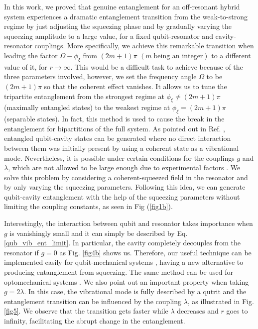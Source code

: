 In this work, we proved that genuine entanglement for an off-resonant hybrid system experiences a dramatic entanglement transition from the weak-to-strong regime by just adjusting the squeezing phase and by gradually varying the squeezing amplitude to a large value, for a fixed qubit-resonator and cavity-resonator couplings. More specifically, we achieve this remarkable transition when leading the factor $\Omega-\phi_{\xi}$ from $(2m+1)\pi$ $(m\; \text{being an integer})$ to a different value of it, for $r\rightarrow \infty$. This would be a difficult task to achieve because of the three parameters involved, however, we set the frequency angle $\Omega$ to be $(2m+1)\pi$ so that the coherent effect vanishes. It allows us to tune the tripartite entanglement from the strongest regime at $\phi_{\xi}\neq (2m+1)\pi$ (maximally entangled states) to the weakest regime at $\phi_{\xi}=(2m+1)\pi$ (separable states). In fact, this method is used to cause the break in the entanglement for bipartitions of the full system. As pointed out in Ref. \citep{montenegro2019mechanical}, entangled qubit-cavity states can be generated where no direct interaction between them was initially present by using a coherent state as a vibrational mode. Nevertheless, it is possible under certain conditions for the couplings $g$ and $\lambda$, which are not allowed to be large enough due to experimental factors \cite{xuereb2012strong, vanner2011pulsed}. We solve this problem by considering a coherent-squeezed field in the resonator and by only varying the squeezing parameters. Following this idea, we can generate qubit-cavity entanglement with the help of the squeezing parameters without limiting the coupling constants, as seen in Fig (\ref{fig1b}). 

Interestingly, the interaction between qubit and resonator takes importance when $g$ is vanishingly small and it can simply be described by Eq. \eqref{qub_vib_ent_limit}. In particular, the cavity completely decouples from the resonator if $g=0$ as Fig. \ref{fig4b} shows us. Therefore, our useful technique can be implemented easily for qubit-mechanical systems \cite{montenegro2014nonlinearity, montenegro2018ground}, having a new alternative to producing entanglement from squeezing. The same method can be used for optomechanical systems \cite{bose1997preparation}. We also point out an important property when taking $g=2\lambda$. In this case, the vibrational mode is fully described by a qutrit and the entanglement transition can be influenced by the coupling $\lambda$, as illustrated in Fig. \ref{fig5}. We observe that the transition gets faster while $\lambda$ decreases and $r$ goes to infinity, facilitating the abrupt change in the entanglement.

